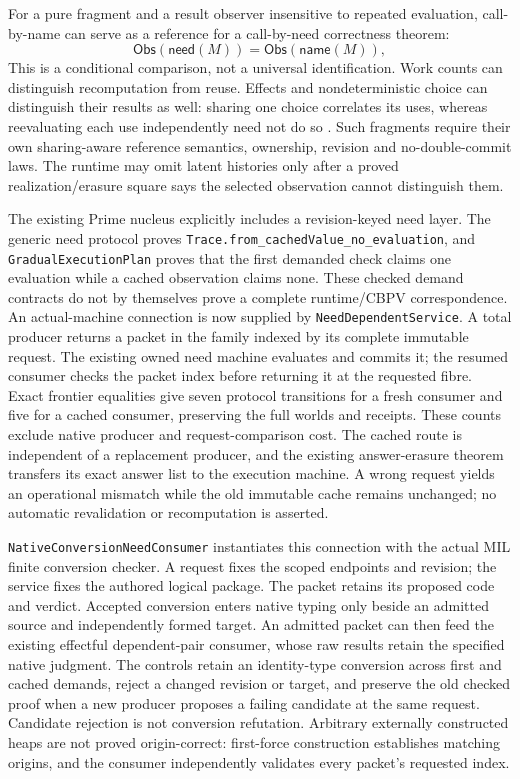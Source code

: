 \documentclass[11pt]{article}
\theoremstyle{definition}
\theoremstyle{remark}
\newcommand{\Obs}{\mathsf{Obs}}
\begin{document}
For a pure fragment and a result observer insensitive to repeated evaluation,
call-by-name can serve as a reference for a call-by-need correctness theorem:
\[
  \Obs(\mathsf{need}(M))=\Obs(\mathsf{name}(M)),
\]
This is a conditional comparison, not a universal identification. Work counts
can distinguish recomputation from reuse. Effects and nondeterministic choice
can distinguish their results as well: sharing one choice correlates its
uses, whereas reevaluating each use independently need not do so
\cite{CurryLazyEvaluation}. Such fragments require their own sharing-aware
reference semantics, ownership, revision and no-double-commit laws. The
runtime may omit latent histories only after a proved realization/erasure
square says the selected observation cannot distinguish them.

The existing Prime nucleus explicitly includes a revision-keyed need layer.
The generic need protocol proves
\nolinkurl{Trace.from_cachedValue_no_evaluation}, and
\nolinkurl{GradualExecutionPlan} proves that the first demanded check claims
one evaluation while a cached observation claims none. These checked demand
contracts do not by themselves prove a complete runtime/CBPV correspondence.
An actual-machine connection is now supplied by
\nolinkurl{NeedDependentService}. A total producer returns a packet in
the family indexed by its complete immutable request. The existing owned
need machine evaluates and commits it; the resumed consumer checks the packet
index before returning it at the requested fibre. Exact frontier equalities
give seven protocol transitions for a fresh consumer and five for a cached
consumer, preserving the full worlds and receipts. These counts exclude
native producer and request-comparison cost. The cached route is independent
of a replacement producer, and the existing answer-erasure theorem transfers
its exact answer list to the execution machine. A wrong request yields an
operational mismatch while the old immutable cache remains unchanged; no
automatic revalidation or recomputation is asserted.

\nolinkurl{NativeConversionNeedConsumer} instantiates this connection with
the actual MIL finite conversion checker. A request fixes the scoped endpoints
and revision; the service fixes the authored logical package. The packet
retains its proposed code and verdict. Accepted conversion enters native
typing only beside an admitted source and independently formed target.
An admitted packet can then feed the existing effectful dependent-pair
consumer, whose raw results retain the specified native judgment.
The controls retain an identity-type conversion across first and cached
demands, reject a changed revision or target, and preserve the old checked
proof when a new producer proposes a failing candidate at the same request.
Candidate rejection is not conversion refutation. Arbitrary externally
constructed heaps are not proved origin-correct: first-force construction
establishes matching origins, and the consumer independently validates every
packet's requested index.
\end{document}
